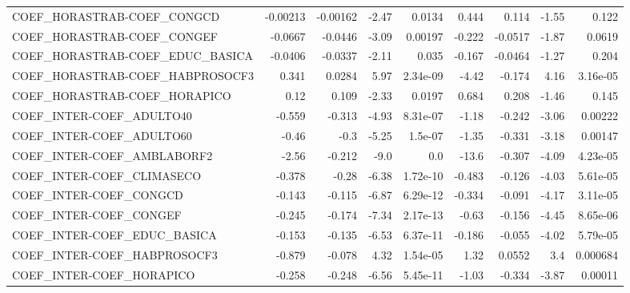 \begin{tabular}{lrrrrrrrr}
COEF\_HORASTRAB-COEF\_CONGCD             &    -0.00213 &     -0.00162 &    -2.47 &   0.0134 &      0.444 &       0.114 &        -1.55 &         0.122 \\
COEF\_HORASTRAB-COEF\_CONGEF             &     -0.0667 &      -0.0446 &    -3.09 &  0.00197 &     -0.222 &     -0.0517 &        -1.87 &        0.0619 \\
COEF\_HORASTRAB-COEF\_EDUC\_BASICA        &     -0.0406 &      -0.0337 &    -2.11 &    0.035 &     -0.167 &     -0.0464 &        -1.27 &         0.204 \\
COEF\_HORASTRAB-COEF\_HABPROSOCF3        &       0.341 &       0.0284 &     5.97 & 2.34e-09 &      -4.42 &      -0.174 &         4.16 &      3.16e-05 \\
COEF\_HORASTRAB-COEF\_HORAPICO           &        0.12 &        0.109 &    -2.33 &   0.0197 &      0.684 &       0.208 &        -1.46 &         0.145 \\
COEF\_INTER-COEF\_ADULTO40               &      -0.559 &       -0.313 &    -4.93 & 8.31e-07 &      -1.18 &      -0.242 &        -3.06 &       0.00222 \\
COEF\_INTER-COEF\_ADULTO60               &       -0.46 &         -0.3 &    -5.25 &  1.5e-07 &      -1.35 &      -0.331 &        -3.18 &       0.00147 \\
COEF\_INTER-COEF\_AMBLABORF2             &       -2.56 &       -0.212 &     -9.0 &      0.0 &      -13.6 &      -0.307 &        -4.09 &      4.23e-05 \\
COEF\_INTER-COEF\_CLIMASECO              &      -0.378 &        -0.28 &    -6.38 & 1.72e-10 &     -0.483 &      -0.126 &        -4.03 &      5.61e-05 \\
COEF\_INTER-COEF\_CONGCD                 &      -0.143 &       -0.115 &    -6.87 & 6.29e-12 &     -0.334 &      -0.091 &        -4.17 &      3.11e-05 \\
COEF\_INTER-COEF\_CONGEF                 &      -0.245 &       -0.174 &    -7.34 & 2.17e-13 &      -0.63 &      -0.156 &        -4.45 &      8.65e-06 \\
COEF\_INTER-COEF\_EDUC\_BASICA            &      -0.153 &       -0.135 &    -6.53 & 6.37e-11 &     -0.186 &      -0.055 &        -4.02 &      5.79e-05 \\
COEF\_INTER-COEF\_HABPROSOCF3            &      -0.879 &       -0.078 &     4.32 & 1.54e-05 &       1.32 &      0.0552 &          3.4 &      0.000684 \\
COEF\_INTER-COEF\_HORAPICO               &      -0.258 &       -0.248 &    -6.56 & 5.45e-11 &      -1.03 &      -0.334 &        -3.87 &       0.00011 \\

\end{tabular}
